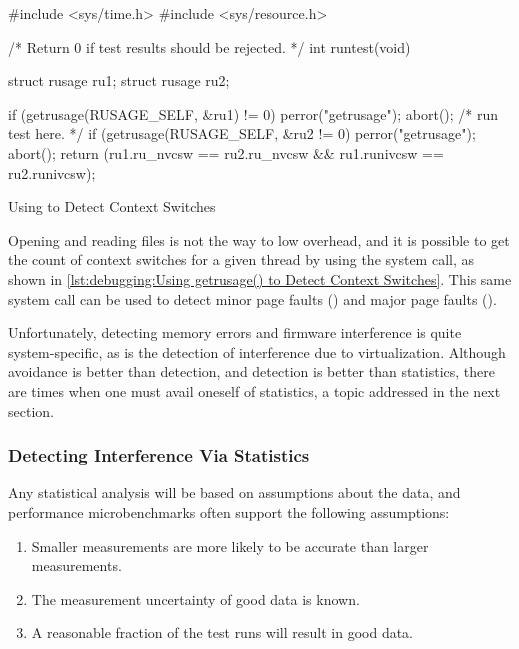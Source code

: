 \begin{listing}
\begin{fcvlabel}
\begin{VerbatimL}
#include <sys/time.h>
#include <sys/resource.h>

/* Return 0 if test results should be rejected. */
int runtest(void)
{
	struct rusage ru1;
	struct rusage ru2;

	if (getrusage(RUSAGE_SELF, &ru1) != 0) {
		perror("getrusage");
		abort();
	}
	/* run test here. */
	if (getrusage(RUSAGE_SELF, &ru2 != 0) {
		perror("getrusage");
		abort();
	}
	return (ru1.ru_nvcsw == ru2.ru_nvcsw &&
	        ru1.runivcsw == ru2.runivcsw);
}
\end{VerbatimL}
\end{fcvlabel}
\caption{Using  to Detect Context Switches}
\label{lst:debugging:Using getrusage() to Detect Context Switches}
\end{listing}

Opening and reading files is not the way to low overhead, and it is
possible to get the count of context switches for a given thread
by using the  system call, as shown in
\cref{lst:debugging:Using getrusage() to Detect Context Switches}.
This same system call can be used to detect minor page faults ()
and major page faults ().

Unfortunately, detecting memory errors and firmware interference is quite
system-specific, as is the detection of interference due to virtualization.
Although avoidance is better than detection, and detection is better than
statistics, there are times when one must avail oneself of statistics,
a topic addressed in the next section.

\subsubsection{Detecting Interference Via Statistics}
\label{sec:debugging:Detecting Interference Via Statistics}

Any statistical analysis will be based on assumptions about the data,
and performance microbenchmarks often support the following assumptions:

\begin{enumerate}
\item	Smaller measurements are more likely to be accurate than
	larger measurements.
\item	The measurement uncertainty of good data is known.
\item	A reasonable fraction of the test runs will result in good data.
\end{enumerate}

